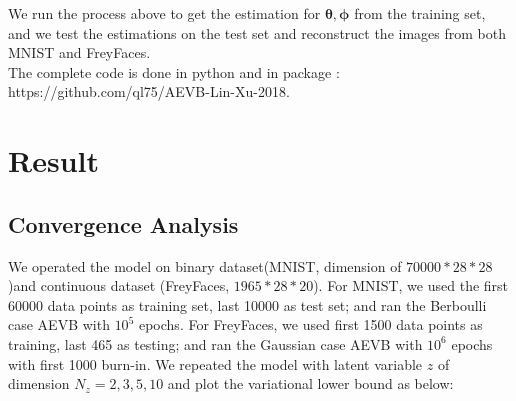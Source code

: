 \documentclass[11pt]{article}
\begin{document}

\vspace{5mm}
\noindent
We run the process above to get the estimation for $\mathbf{\theta, \phi}$ from the training set, and we test the estimations on the test set and reconstruct the images from both MNIST and FreyFaces. \\

\noindent
The complete code is done in python and in package :\\ https://github.com/ql75/AEVB-Lin-Xu-2018.


\section{Result}
\subsection{Convergence Analysis}
\noindent
We operated the model on binary dataset(MNIST, dimension of $70000*28*28$)and continuous dataset (FreyFaces, $1965*28*20$). For MNIST, we used the first 60000 data points as training set, last 10000 as test set; and ran the Berboulli case AEVB with $10^5$ epochs. For FreyFaces, we used first 1500 data points as training, last 465 as testing; and ran  the Gaussian case AEVB with $10^6$ epochs with first 1000 burn-in. We repeated the model with latent variable $z$ of dimension $N_z= 2,3,5,10$ and plot the variational lower bound as below:
\end{document}
